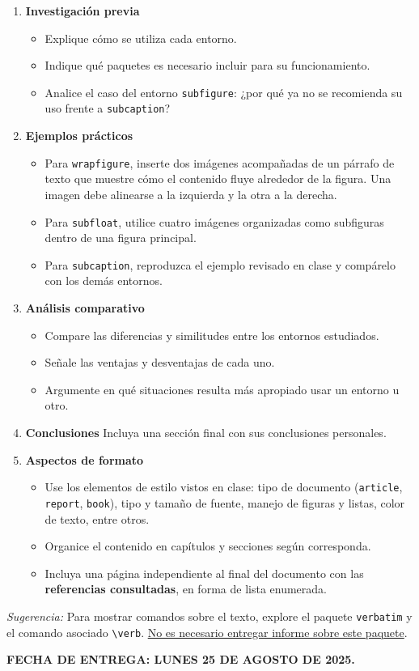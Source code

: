 \documentclass{article}
\begin{document}
\begin{enumerate}
    \item \textbf{Investigación previa}
    \begin{itemize}
        \item Explique cómo se utiliza cada entorno.  
        \item Indique qué paquetes es necesario incluir para su funcionamiento.  
        \item Analice el caso del entorno \texttt{subfigure}: ¿por qué ya no se recomienda su uso frente a \texttt{subcaption}?  
    \end{itemize}
    
    \item \textbf{Ejemplos prácticos}
    \begin{itemize}
        \item Para \texttt{wrapfigure}, inserte dos imágenes acompañadas de un párrafo de texto que muestre cómo el contenido fluye alrededor de la figura. Una imagen debe alinearse a la izquierda y la otra a la derecha.  
        \item Para \texttt{subfloat}, utilice cuatro imágenes organizadas como subfiguras dentro de una figura principal.  
        \item Para \texttt{subcaption}, reproduzca el ejemplo revisado en clase y compárelo con los demás entornos.  
    \end{itemize}
    
    \item \textbf{Análisis comparativo}
    \begin{itemize}
        \item Compare las diferencias y similitudes entre los entornos estudiados.  
        \item Señale las ventajas y desventajas de cada uno.  
        \item Argumente en qué situaciones resulta más apropiado usar un entorno u otro.  
    \end{itemize}
    
    \item \textbf{Conclusiones}  
    Incluya una sección final con sus conclusiones personales.  
    
    \item \textbf{Aspectos de formato}
    \begin{itemize}
        \item Use los elementos de estilo vistos en clase: tipo de documento (\texttt{article}, \texttt{report}, \texttt{book}), tipo y tamaño de fuente, manejo de figuras y listas, color de texto, entre otros.  
        \item Organice el contenido en capítulos y secciones según corresponda.  
        \item Incluya una página independiente al final del documento con las \textbf{referencias consultadas}, en forma de lista enumerada.  
    \end{itemize}
\end{enumerate}

\textit{Sugerencia:} Para mostrar comandos sobre el texto, explore el paquete \verb|verbatim| y el comando asociado \verb|\verb|. \underline{No es necesario entregar informe sobre este paquete}.

\vspace{5mm}
\textbf{FECHA DE ENTREGA: LUNES 25 DE AGOSTO DE 2025.}
\end{document}
